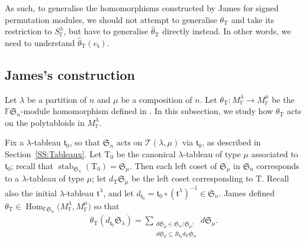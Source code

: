 \documentclass[11pt]{article}
\renewcommand{\t}{\mathfrak{t}}
\newcommand{\TT}{\mathscr{T}}
\newcommand{\T}{\mathrm{T}}
\newcommand{\Hom}{\operatorname{Hom}}
\newcommand{\stab}{\operatorname{stab}}
\newcommand{\sym}[1]{\mathfrak{S}_{#1}}
\newcommand{\F}{\mathbb{F}}
\begin{document}
As such, to generalise the homomorphisms constructed by James for signed permutation modules, we should not attempt to generalise $\theta_\T$ and take its restriction to $S_\F^{\lambda}$, but have to generalise $\hat{\theta}_\T$ directly instead. In other words, we need to understand $\hat{\theta}_\T(e_\t)$.

\subsection{James's construction}
Let $\lambda$ be a partition of $n$ and $\mu$ be a composition of $n$. Let $\theta_{\T} \colon M_\F^{\lambda} \to M_\F^{\mu}$ be the $\F\sym{n}$-module homomorphism defined in \cite[Section~13]{GJ}. In this subsection, we study how $\theta_{\T}$ acts on the polytabloids in $M_\F^{\lambda}$.

Fix a $\lambda$-tableau $\t_0$, so that $\sym{n}$ acts on $\TT(\lambda,\mu)$ via $\t_0$, as described in Section~\ref{SS:Tableaux}.
Let $\T_0$ be the canonical $\lambda$-tableau of type $\mu$ associated to $\t_0$; recall that $\stab_{\sym{n}}(\T_0) = \sym{\mu}$.
Then each left coset of $\sym{\mu}$ in $\sym{n}$ corresponds to a $\lambda$-tableau of type $\mu$; let $d_\T\sym{\mu}$ be the left coset corresponding to $\T$.
Recall also the initial $\lambda$-tableau $\t^{\lambda}$, and let $d_{\t_0} = \t_0 \circ (\t^{\lambda})^{-1} \in \sym{n}$.
James defined $\theta_\T \in \Hom_{\F\sym{n}}\big(M_\F^{\lambda}, M_\F^{\mu}\big)$ so that
\begin{gather*}\theta_{\T}(d_{\t_0}\sym{\lambda}) = \sum_{\substack{d\sym{\mu} \in \sym{n}/\sym{\mu}: \\ d\sym{\mu} \subseteq R_{\t_0} d_\T \sym{\mu}}} d \sym{\mu}.\end{gather*}
\end{document}
